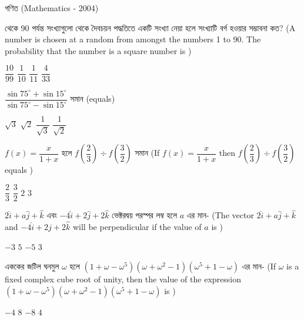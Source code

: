 \documentclass[addpoints]{exam}
\begin{document}
\begin{LARGE}
\begin{center}
গণিত (Mathematics - 2004)
\end{center}
\end{LARGE}
\begin{questions}

  থেকে 90 পর্যন্ত সংখ্যাগুলো থেকে দৈবচয়ন পদ্ধতিতে একটি সংখ্যা নেয়া হলে সংখ্যাটি বর্গ হওয়ার সম্ভাবনা কত? (A number is chosen at a random from amongst the numbers 1 to 90.  The probability that the number is a square number is )

\begin{oneparchoices}
\choice $ \dfrac{10}{99} $
\choice $ \dfrac{1}{10} $
\choice $ \dfrac{1}{11} $
\choice $ \dfrac{4}{33} $
\end{oneparchoices}


\question $ \dfrac{\sin 75^{\circ}+\sin 15^{\circ}}{\sin 75^{\circ}-\sin 15^{\circ}} $ সমান (equals)

\begin{oneparchoices}
\choice $ \sqrt{3} $
\choice $ \sqrt{2} $
\choice $ \dfrac{1}{\sqrt{3}} $
\choice $ \dfrac{1}{\sqrt{2}} $
\end{oneparchoices}

\question $ f(x) = \dfrac{x}{1+x} $ হলে $ f(\dfrac{2}{3})\div f(\dfrac{3}{2}) $ সমান (If $ f(x) = \dfrac{x}{1+x} $ then $ f(\dfrac{2}{3})\div f(\dfrac{3}{2}) $ equals ) 

\begin{oneparchoices}
\choice $ \dfrac{2}{3} $
\choice $ \dfrac{3}{2} $
\choice $ 2 $
\choice $ 3 $
\end{oneparchoices}

\question  $ 2\hat{i}+a\hat{j}+\hat{k} $ এবং $ -4\hat{i}+2\hat{j}+2\hat{k} $ ভেক্টরদ্বয় পরস্পর লম্ব হলে $ a $ এর মান- (The vector $ 2\hat{i}+a\hat{j}+\hat{k} $ and $ -4\hat{i}+2\hat{j}+2\hat{k} $ will be perpendicular if the value of $ a $ is )

\begin{oneparchoices}
\choice $ -3 $
\choice $ 5 $
\choice $ -5 $
\choice $ 3 $
\end{oneparchoices}

\question এককের জটিল ঘনমুল $ \omega $ হলে $ (1+\omega-\omega^{5})(\omega + \omega^{2}-1)(\omega^{5}+1-\omega) $ এর মান- (If $ \omega $ is a fixed complex cube root of unity, then the value of the expression $ (1+\omega-\omega^{5})(\omega + \omega^{2}-1)(\omega^{5}+1-\omega) $ is ) 

\begin{oneparchoices}
\choice $ -4 $
\choice $ 8 $
\choice $ -8 $
\choice $ 4 $
\end{oneparchoices}


\end{questions}
\end{document}
